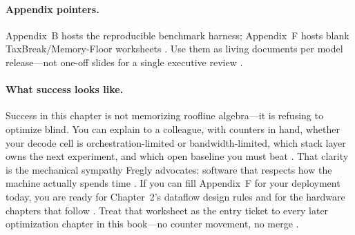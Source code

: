\paragraph{Appendix pointers.}
Appendix~B hosts the reproducible benchmark harness; Appendix~F hosts blank TaxBreak/Memory-Floor worksheets \citep{taxbreak2026,memoryfloor2026}.
Use them as living documents per model release---not one-off slides for a single executive review \citep{fan2025ellieenergyefficie}.

\paragraph{What success looks like.}
Success in this chapter is not memorizing roofline algebra---it is refusing to optimize blind.
You can explain to a colleague, with counters in hand, whether your decode cell is orchestration-limited or bandwidth-limited, which stack layer owns the next experiment, and which open baseline you must beat \citep{taxbreak2026,memoryfloor2026,kwon2023vllm}.
That clarity is the mechanical sympathy Fregly advocates: software that respects how the machine actually spends time \citep{patel2025llminference}.
If you can fill Appendix~F for your deployment today, you are ready for Chapter~2's dataflow design rules and for the hardware chapters that follow \citep{chen2020compilerbasedhardw,yirage2026}.
Treat that worksheet as the entry ticket to every later optimization chapter in this book---no counter movement, no merge \citep{taxbreak2026,memoryfloor2026}.

